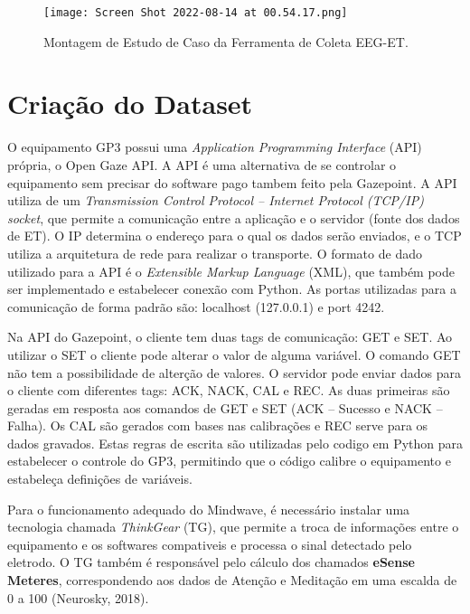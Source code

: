 \begin{figure}
    \centering
    \texttt{[image: Screen Shot 2022-08-14 at 00.54.17.png]}
    \caption{Montagem de Estudo de Caso da Ferramenta de Coleta EEG-ET.}
\end{figure}



\section{Criação do Dataset}
O equipamento GP3 possui uma \textit{Application Programming Interface} (API) própria, 
o Open Gaze API. 
A API é uma alternativa de se controlar o equipamento sem precisar do software 
pago tambem feito pela Gazepoint. A API utiliza de um \textit{Transmission Control Protocol – Internet Protocol (TCP/IP) 
socket}, que permite a comunicação entre a aplicação e o servidor (fonte dos dados de ET). 
O IP determina o endereço para o qual os dados serão enviados, e o TCP utiliza a arquitetura de 
rede para realizar o transporte. O formato de dado utilizado para a API é o \textit{Extensible Markup Language} (XML), 
que também pode ser implementado e estabelecer conexão com Python. 
As portas utilizadas para a comunicação de forma padrão são: 
localhost (127.0.0.1) e port 4242. 

Na API do Gazepoint, o cliente tem duas tags de comunicação: GET e SET. 
Ao utilizar o SET o cliente pode alterar o valor de alguma variável. 
O comando GET não tem a possibilidade de alterção de valores. O servidor 
pode enviar dados para o cliente com diferentes tags: ACK, NACK, CAL e REC. 
As duas primeiras são geradas em resposta aos comandos de GET e SET (ACK – Sucesso e NACK –Falha). 
Os CAL são gerados com bases nas calibrações e REC serve para os dados gravados. 
Estas regras de escrita são utilizadas pelo codigo em Python para estabelecer o controle do GP3,
 permitindo que o código calibre o equipamento e estabeleça definições de variáveis.

Para o funcionamento adequado do Mindwave, é necessário instalar uma tecnologia chamada \textit{ThinkGear} (TG), 
que permite a troca de informações entre o equipamento e os softwares compativeis e processa o 
sinal detectado pelo eletrodo. O TG também é responsável pelo cálculo dos chamados \textbf{eSense Meteres}, 
correspondendo aos dados de Atenção e Meditação em uma escalda de 0 a 100 (Neurosky, 2018). 


